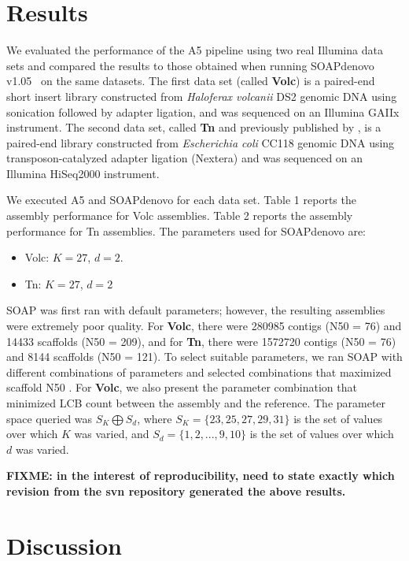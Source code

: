 \documentclass{bioinfo}
\begin{document}
\section{Results}

We evaluated the performance of the A5 pipeline using two real Illumina data sets and compared the results to
those obtained when running SOAPdenovo v1.05~\citep{Li2010} on the same datasets. The first data set (called \textbf{Volc}) is a paired-end short insert library constructed from \emph{Haloferax volcanii} DS2 genomic DNA 
using sonication followed by adapter ligation, and was sequenced on an Illumina GAIIx instrument. 
The second data set, called \textbf{Tn} and previously published by \citet{Adey2010}, is a paired-end library constructed from \emph{Escherichia coli} CC118 genomic DNA
using transposon-catalyzed adapter ligation (Nextera) and was sequenced on an Illumina HiSeq2000 instrument. 

We executed A5 and SOAPdenovo for each data set. Table 1 reports the assembly performance for Volc assemblies.
Table 2 reports the assembly performance for Tn assemblies. The parameters used for SOAPdenovo are:
\begin{itemize}
\item Volc: $K = 27$, $d = 2$.
\item Tn: $K = 27$, $d = 2$
\end{itemize}
SOAP was first ran with default parameters; however, the resulting assemblies were extremely poor quality. For \textbf{Volc}, there were
280985 contigs (N50 = 76) and 14433 scaffolds (N50 = 209), and for \textbf{Tn}, there were 1572720 contigs (N50 = 76) and 8144 scaffolds (N50 = 121). 
To select suitable parameters, we ran SOAP with different combinations of parameters and selected combinations that maximized scaffold N50 . For \textbf{Volc},
we also present the parameter combination that minimized LCB count between the assembly and the reference. The parameter space queried was $S_K \bigoplus S_d$,
where $S_K = \{23,25,27,29,31\}$ is the set of values over which $K$ was varied, and $S_d = \{1,2,...,9,10\}$ is the set of values over which $d$
was varied.

\textbf{FIXME: in the interest of reproducibility, need to state exactly which revision from the svn repository generated the above results.}

\section{Discussion}
\end{document}
